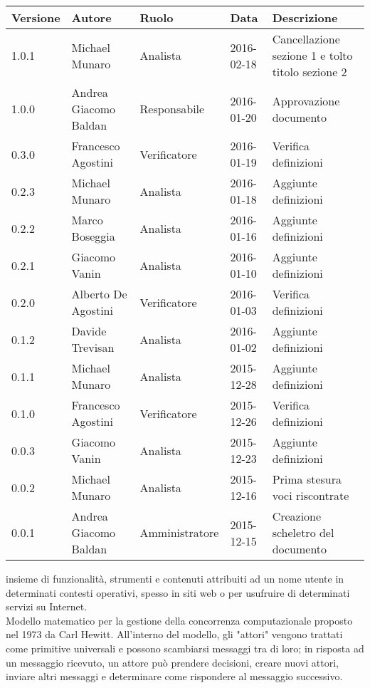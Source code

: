 \documentclass{scalatekids-article}
\begin{document}
\begin{center}
  \begin{tabular}{|l | l | l | l | l |}
    \hline
    Versione & Autore & Ruolo & Data & Descrizione \\
    \hline
    1.0.1 & Michael Munaro & Analista & 2016-02-18 & Cancellazione sezione 1 e tolto titolo sezione 2\\
    \hline
    1.0.0 & Andrea Giacomo Baldan & Responsabile & 2016-01-20 & Approvazione documento\\
    \hline
    0.3.0 & Francesco Agostini & Verificatore & 2016-01-19 & Verifica definizioni\\
    \hline
    0.2.3 & Michael Munaro & Analista & 2016-01-18 & Aggiunte definizioni\\
    \hline
    0.2.2 & Marco Boseggia & Analista & 2016-01-16 & Aggiunte definizioni\\
    \hline
    0.2.1 & Giacomo Vanin & Analista & 2016-01-10 & Aggiunte definizioni\\
    \hline
    0.2.0 & Alberto De Agostini & Verificatore & 2016-01-03 & Verifica definizioni\\
    \hline
    0.1.2 & Davide Trevisan & Analista & 2016-01-02 & Aggiunte definizioni\\
    \hline
    0.1.1 & Michael Munaro & Analista & 2015-12-28 & Aggiunte definizioni\\
    \hline
    0.1.0 & Francesco Agostini & Verificatore & 2015-12-26 & Verifica definizioni\\
    \hline
    0.0.3 & Giacomo Vanin & Analista & 2015-12-23 & Aggiunte definizioni\\
    \hline
    0.0.2 & Michael Munaro & Analista & 2015-12-16 & Prima stesura voci riscontrate\\
    \hline
    0.0.1 & Andrea Giacomo Baldan & Amministratore & 2015-12-15 & Creazione scheletro del documento\\
    \hline
  \end{tabular}
\end{center}

\newpage
{}
 insieme di funzionalità, strumenti e contenuti attribuiti ad un nome utente in determinati contesti operativi, spesso in siti web o per usufruire di determinati servizi su Internet.
\\

 Modello matematico per la gestione della concorrenza computazionale proposto nel 1973 da Carl Hewitt.
All'interno del modello, gli "attori" vengono trattati come primitive universali e possono scambiarsi messaggi tra di loro; in risposta ad un messaggio ricevuto, un attore può prendere decisioni, creare nuovi attori, inviare altri messaggi e determinare come rispondere al messaggio successivo.
\\
\end{document}
